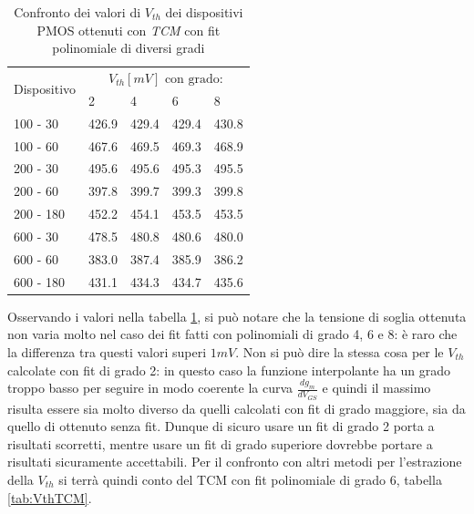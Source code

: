 \documentclass[12pt, letterpaper]{book}
\begin{document}
\begin{table}[h]
  \renewcommand{\arraystretch}{1.3}
  \centering
  \begin{tabular}{m{2cm} m{2cm} m{2cm} m{2cm} m{2cm}}
    \toprule
    \multirow{2}{*}{Dispositivo} & \multicolumn{4}{c}{$V_{th} [mV] \text{ con grado:}$} \\
    \cmidrule{2-5}
                                  & 2 &4 &  6 & 8 \\
    \midrule
    100 - 30                     & 426.9   & 429.4   & 429.4   & 430.8   \\
    \hline
    100 - 60                     & 467.6   & 469.5   & 469.3   & 468.9   \\
    \hline
    200 - 30                     & 495.6   & 495.6   & 495.3   & 495.5   \\
    \hline
    200 - 60                     & 397.8   & 399.7   & 399.3   & 399.8   \\
    \hline
    200 - 180                    & 452.2   & 454.1   & 453.5   & 453.5   \\
    \hline
    600 - 30                     & 478.5   & 480.8   & 480.6   & 480.0   \\
    \hline
    600 - 60                     & 383.0   & 387.4   & 385.9   & 386.2   \\
    \hline
    600 - 180                    & 431.1   & 434.3   & 434.7   & 435.6   \\
    \bottomrule
  \end{tabular}
  \caption{Confronto dei valori di $V_{th}$ dei dispositivi PMOS ottenuti con \emph{TCM} con fit polinomiale di diversi gradi}
  \label{tab:GradiTCM}
\end{table}

Osservando i valori nella tabella \ref{tab:GradiTCM}, si può notare che la tensione di soglia ottenuta non varia molto nel caso dei fit fatti con polinomiali di grado 4, 6 e 8: è raro che la differenza tra questi valori superi $1 mV$. Non si può dire la stessa cosa per le $V_{th}$ calcolate con fit di grado 2: in questo caso la funzione interpolante ha un grado troppo basso per seguire in modo coerente la curva $\frac{dg_m}{dV_{GS}}$ e quindi il massimo risulta essere sia molto diverso da quelli calcolati con fit di grado maggiore, sia da quello di ottenuto senza fit. Dunque di sicuro usare un fit di grado 2 porta a risultati scorretti, mentre usare un fit di grado superiore dovrebbe portare a risultati sicuramente accettabili. Per il confronto con altri metodi per l'estrazione della $V_{th}$ si terrà quindi conto del TCM con fit polinomiale di grado 6, tabella \ref{tab:VthTCM}.
\end{document}
